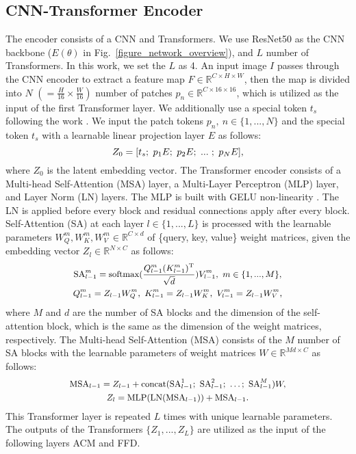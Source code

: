 \documentclass[letterpaper]{article} \usepackage{aaai23}  \usepackage{times}  \usepackage{helvet}  \usepackage{courier}  \usepackage[hyphens]{url}  \usepackage{graphicx} \urlstyle{rm} \def\UrlFont{\rm}  \usepackage{natbib}  \usepackage{caption} \frenchspacing  \setlength{\pdfpagewidth}{8.5in} \setlength{\pdfpageheight}{11in} \usepackage{algorithm}
\newcommand{\figref}[1]{Fig.~\ref{#1}}
\begin{document}
\subsection{CNN-Transformer Encoder}
\label{sec:encoder}
The encoder consists of a CNN and Transformers. We use ResNet50 \cite{he2016deep} as the CNN backbone ($E(\theta)$ in \figref{figure_network_overview}), and $L$ number of Transformers. In this work, we set the $L$ as 4. 
An input image $I$ passes through the CNN encoder to extract a feature map $F \in \mathbb{R}^{C \times H \times W}$, then the map is divided into $N$ $(= \frac{H}{16} \times \frac{W}{16})$ number of patches $p_{n} \in \mathbb{R}^{C\times 16 \times 16}$, which is utilized as the input of the first Transformer layer.
We additionally use a special token $t_s$ following the work \cite{ranftl2021vision}.
We input the patch tokens $p_{n},~n \in\{{1,...,N}\}$ and the special token $t_s$ with a learnable linear projection layer $E$ as follows:
\begin{equation}
\small
    Z_0 = [t_s;~p_1E;~p_2E;~...~;~p_{N}E],
\end{equation}
where $Z_0$ is the latent embedding vector.
The Transformer encoder consists of a Multi-head Self-Attention (MSA) layer, a Multi-Layer Perceptron (MLP) layer, and Layer Norm (LN) layers. The MLP is built with GELU non-linearity \cite{hendrycks2016gaussian}. The LN is applied before every block and residual connections apply after every block.
Self-Attention (SA) at each layer $l \in \{1,...,L\}$ is processed with the learnable parameters $W^m_Q , W^m_K , W^m_V \in \mathbb{R}^{C \times d}$ of \{query, key, value\} weight matrices, given the embedding vector $Z_l \in \mathbb{R}^{N \times C}$ as follows:
\begin{equation}
\small
\begin{gathered}
        \text{SA}^m_{l-1} = \text{softmax}(\frac{Q^m_{l-1} (K^m_{l-1})^\text{T}}{\sqrt{d}} )V^m_{l-1},~m \in \{1,...,M\},\\
    Q^m_{l-1} = Z_{l-1}W^m_Q,~K^m_{l-1} = Z_{l-1}W^m_K,~V^m_{l-1} = Z_{l-1}W^m_V,
\end{gathered}
\end{equation}
where $M$ and $d$ are the number of SA blocks and the dimension of the self-attention block, which is the same as the dimension of the weight matrices, respectively. 
The Multi-head Self-Attention (MSA) consists of the $M$ number of SA blocks with the learnable parameters of weight
matrices $W \in \mathbb{R}^{Md \times C }$ as follows:
\begin{equation}
\small
\begin{gathered}
\text{MSA}_{l-1} = Z_{l-1} +  \text{concat}(\text{SA}^1_{l-1};~\text{SA}^2_{l-1};~ \dots ;~\text{SA}^M_{l-1} )W,\\
Z_{l} = \text{MLP}(\text{LN}(\text{MSA}_{l-1}))+\text{MSA}_{l-1}.
\end{gathered}
\end{equation}
This Transformer layer is repeated $L$ times with unique learnable parameters. The outputs of the Transformers $\{Z_1,...,Z_L\}$ are utilized as the input of the following layers ACM and FFD.
\end{document}

